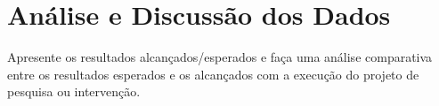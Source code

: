\chapter{An\'alise e Discuss\~ao dos Dados}
\label{cap:resultados}

Apresente os resultados alcan\c{c}ados/esperados e fa\c{c}a uma an\'alise
comparativa entre os resultados esperados e os alcan\c{c}ados com a
execu\c{c}\~ao do projeto de pesquisa ou interven\c{c}\~ao.

